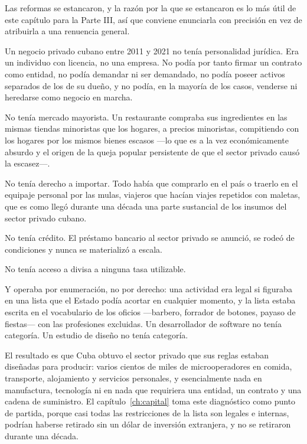 Las reformas se estancaron, y la razón por la que se estancaron es lo más útil de
este capítulo para la Parte III, así que conviene enunciarla con precisión en vez
de atribuirla a una renuencia general.

Un negocio privado cubano entre 2011 y 2021 no tenía personalidad jurídica. Era un
individuo con licencia, no una empresa. No podía por tanto firmar un contrato como
entidad, no podía demandar ni ser demandado, no podía poseer activos separados de
los de su dueño, y no podía, en la mayoría de los casos, venderse ni heredarse como
negocio en marcha.

No tenía mercado mayorista. Un restaurante compraba sus ingredientes en las mismas
tiendas minoristas que los hogares, a precios minoristas, compitiendo con los
hogares por los mismos bienes escasos ---lo que es a la vez económicamente absurdo
y el origen de la queja popular persistente de que el sector privado causó la
escasez---.

No tenía derecho a importar. Todo había que comprarlo en el país o traerlo en el
equipaje personal por las mulas, viajeros que hacían viajes repetidos con maletas,
que es como llegó durante una década una parte sustancial de los insumos del
sector privado cubano.

No tenía crédito. El préstamo bancario al sector privado se anunció, se rodeó de
condiciones y nunca se materializó a escala.

No tenía acceso a divisa a ninguna tasa utilizable.

Y operaba por enumeración, no por derecho: una actividad era legal si figuraba en
una lista que el Estado podía acortar en cualquier momento, y la lista estaba
escrita en el vocabulario de los oficios ---barbero, forrador de botones, payaso
de fiestas--- con las profesiones excluidas. Un desarrollador de software no tenía
categoría. Un estudio de diseño no tenía categoría.

El resultado es que Cuba obtuvo el sector privado que sus reglas estaban diseñadas
para producir: varios cientos de miles de microoperadores en comida, transporte,
alojamiento y servicios personales, y esencialmente nada en manufactura,
tecnología ni en nada que requiriera una entidad, un contrato y una cadena de
suministro. El capítulo~\ref{ch:capital} toma este diagnóstico como punto de
partida, porque casi todas las restricciones de la lista son legales e internas,
podrían haberse retirado sin un dólar de inversión extranjera, y no se retiraron
durante una década.

